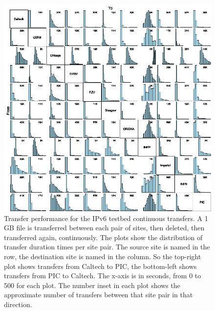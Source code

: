 \begin{figure}[htp]
\centering
\includegraphics{full-mesh}
\caption{Transfer performance for the IPv6 testbed continuous transfers. A 1 GB file is transferred between each pair of sites, then deleted, then transferred again, continuously. The plots show the distribution of transfer duration times per site pair. The source site is named in the row, the destination site is named in the column. So the top-right plot shows transfers from Caltech to PIC, the bottom-left shows transfers from PIC to Caltech. The x-axis is in seconds, from 0 to 500 for each plot. The number inset in each plot shows the approximate number of transfers between that site pair in that direction.}\label{fig:full-mesh}
\end{figure}

